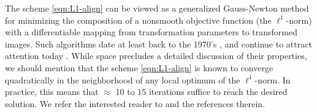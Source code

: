 \documentclass[10pt,journal,letterpaper,compsoc]{IEEEtran} %
\begin{document}
The scheme \eqref{eqn:L1-align} can be viewed as a generalized Gauss-Newton method for minimizing the composition of a nonsmooth objective function (the $\ell^1$-norm) with a differentiable mapping from transformation parameters to transformed images. Such algorithms date at least back to the 1970's  \cite{Cromme1978-NM,Jittorntrum1980-NM}, and continue to attract attention today \cite{Lewis2008-TR}. While space precludes a detailed discussion of their properties, we should mention that the scheme \eqref{eqn:L1-align} is known to converge quadratically in the neighborhood of any local optimum of the $\ell^1$-norm. In practice, this means that $\approx$ 10 to 15 iterations suffice to reach the desired solution. We refer the interested reader to \cite{Jittorntrum1980-NM,Osborne1990-JAMSSB} and the references therein.
\end{document}
